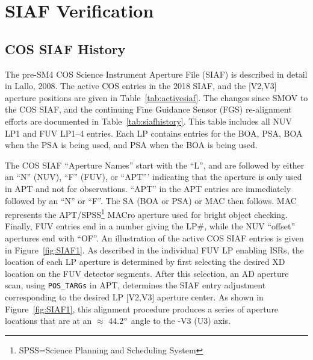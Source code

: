 \section{SIAF Verification} \label{sec:siaf}

\subsection{COS SIAF History}\label{subsec:siafhistory}
The pre-SM4 COS Science Instrument Aperture File (SIAF) is described in detail in Lallo, 2008.
The active COS entries in the 2018 SIAF, and the [V2,V3] aperture positions are given in Table~\ref{tab:activesiaf}.
The changes since SMOV to the COS SIAF, and the continuing Fine Guidance Sensor (FGS) re-alignment efforts are
documented in Table~\ref{tab:siafhistory}.
This table includes all NUV LP1 and FUV LP1--4 entries. Each LP contains entries for the BOA, PSA, BOA when the PSA is being used, and PSA when the BOA is being used.

The COS SIAF ``Aperture Names''  start with the ``L'', and are followed by either an ``N'' (NUV), ``F'' (FUV), or
``APT''' indicating that the aperture is only used in APT and not for observations.
``APT'' in the APT entries are immediately followed by an ``N'' or ``F''.
The SA (BOA or PSA) or MAC then follows. MAC represents the APT/SPSS\footnote{SPSS=Science Planning and Scheduling System} MACro aperture used for bright object checking.
Finally, FUV entries end in a number giving the LP\#, while the NUV ``offset'' apertures end with ``OF''.
An illustration of the active COS SIAF entries is given in Figure~\ref{fig:SIAF1}. As described in the individual
FUV LP enabling ISRs, the location of each LP aperture is determined by first selecting the desired XD location on the FUV detector segments. After this selection,
an AD aperture scan, using \texttt{POS\_TARGs} in APT, determines the SIAF entry adjustment corresponding to
the desired LP [V2,V3] aperture center. As shown in Figure~\ref{fig:SIAF1}, this alignment procedure produces
a series of aperture locations that are at an $\approx$ 44.2$\hbox{$^{\circ}$}$ angle to the -V3 (U3) axis.

